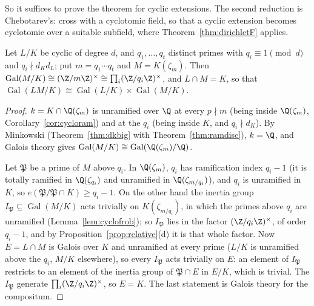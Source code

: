 So it suffices to prove the theorem for cyclic extensions. The second reduction is Chebotarev's: cross with a cyclotomic field, so that a cyclic
extension becomes cyclotomic over a suitable subfield, where Theorem~\ref{thm:dirichletF} applies.

\begin{lemma}\label{lem:disjoint}
Let $L/K$ be cyclic of degree $d$, and $q_1,\dots,q_t$ distinct primes with $q_i\equiv1\pmod d$ and $q_i\nmid d_Kd_L$; put $m=q_1\cdots q_t$ and
$M=K(\zeta_m)$. Then $\operatorname{Gal}(M/K)\cong(\Z/m\Z)^\times\cong\prod_i(\Z/q_i\Z)^\times$, and $L\cap M=K$, so that
$\operatorname{Gal}(LM/K)\cong\operatorname{Gal}(L/K)\times\operatorname{Gal}(M/K)$.
\end{lemma}
\begin{proof}
$k=K\cap\Q(\zeta_m)$ is unramified over $\Q$ at every $p\nmid m$ (being inside $\Q(\zeta_m)$, Corollary~\ref{cor:cycloram}) and at the $q_i$
(being inside $K$, and $q_i\nmid d_K$). By Minkowski (Theorem~\ref{thm:dkbig} with Theorem~\ref{thm:ramdisc}), $k=\Q$, and
Galois theory gives $\operatorname{Gal}(M/K)\cong\operatorname{Gal}(\Q(\zeta_m)/\Q)$.

Let $\mathfrak P$ be a prime of $M$ above $q_i$. In $\Q(\zeta_m)$, $q_i$ has ramification index $q_i-1$ (it is totally ramified in
$\Q(\zeta_{q_i})$ and unramified in $\Q(\zeta_{m/q_i})$), and $q_i$ is unramified in $K$, so $e(\mathfrak P/\mathfrak P\cap K)\ge q_i-1$. On
the other hand the inertia group $I_{\mathfrak P}\subseteq\operatorname{Gal}(M/K)$ acts trivially on $K(\zeta_{m/q_i})$, in which the primes above
$q_i$ are unramified (Lemma~\ref{lem:cyclofrob}); so $I_{\mathfrak P}$ lies in the factor $(\Z/q_i\Z)^\times$, of order $q_i-1$, and by
Proposition~\ref{prop:relative}(d) it is that whole factor. Now $E=L\cap M$ is Galois over $K$ and unramified at every prime ($L/K$ is
unramified above the $q_i$, $M/K$ elsewhere), so every $I_{\mathfrak P}$ acts trivially on $E$: an element of $I_{\mathfrak P}$ restricts to an
element of the inertia group of $\mathfrak P\cap E$ in $E/K$, which is trivial. The $I_{\mathfrak P}$ generate $\prod_i(\Z/q_i\Z)^\times$, so
$E=K$. The last statement is Galois theory for the compositum.
\end{proof}


